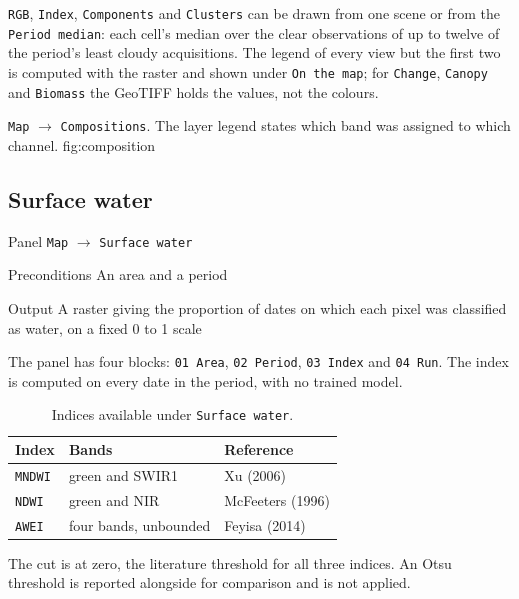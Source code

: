 \documentclass[12pt,a4paper]{article}
\begin{document}
\texttt{RGB}, \texttt{Index}, \texttt{Components} and \texttt{Clusters} can be
drawn from one scene or from the \texttt{Period median}: each cell's median
over the clear observations of up to twelve of the period's least cloudy
acquisitions. The legend of every view but the first two is computed with the
raster and shown under \texttt{On the map}; for \texttt{Change},
\texttt{Canopy} and \texttt{Biomass} the GeoTIFF holds the values, not the
colours.

  {\texttt{Map} $\rightarrow$ \texttt{Compositions}. The layer legend states
   which band was assigned to which channel.}
  {fig:composition}

\subsection{Surface water}

\begin{ficha}
  \item[Panel] \texttt{Map} $\rightarrow$ \texttt{Surface water}
  \item[Preconditions] An area and a period
  \item[Output] A raster giving the proportion of dates on which each pixel was
        classified as water, on a fixed 0 to 1 scale
\end{ficha}

The panel has four blocks: \texttt{01 Area}, \texttt{02 Period},
\texttt{03 Index} and \texttt{04 Run}. The index is computed on every date in
the period, with no trained model.

\begin{table}[htbp]\centering
\caption{Indices available under \texttt{Surface water}.}
\label{tab:water}
\small
\renewcommand{\arraystretch}{1.18}
\begin{tabular}{@{}L{2.2cm}L{5.4cm}L{7.7cm}@{}}
\toprule
\textbf{Index} & \textbf{Bands} & \textbf{Reference} \\
\midrule
\texttt{MNDWI} & green and SWIR1 & Xu (2006) \\
\texttt{NDWI}  & green and NIR & McFeeters (1996) \\
\texttt{AWEI}  & four bands, unbounded & Feyisa (2014) \\
\bottomrule
\end{tabular}
\end{table}

The cut is at zero, the literature threshold for all three indices. An Otsu
threshold is reported alongside for comparison and is not applied.
\end{document}

